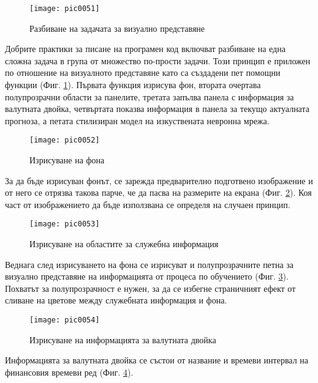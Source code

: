 \begin{figure}[h]
  \centering
  \texttt{[image: pic0051]}
  \caption{Разбиване на задачата за визуално представяне}
\label{fig:pic0051}
\end{figure}
\FloatBarrier

Добрите практики за писане на програмен код включват разбиване на една сложна задача в група от множество по-прости задачи. Този принцип е приложен по отношение на визуалното представяне като са създадени пет помощни функции (Фиг. \ref{fig:pic0051}).  Първата функция изрисува фон, втората очертава полупрозрачни области за панелите, третата запълва панела с информация за валутната двойка, четвъртата показва информация в панела за текущо актуалната прогноза, а петата стилизиран модел на изкуствената невронна мрежа. 

\begin{figure}[h]
  \centering
  \texttt{[image: pic0052]}
  \caption{Изрисуване на фона}
\label{fig:pic0052}
\end{figure}
\FloatBarrier

За да бъде изрисуван фонът, се зарежда предварително подготвено изображение и от него се отрязва такова парче, че да пасва на размерите на екрана (Фиг. \ref{fig:pic0052}). Коя част от изображението да бъде използвана се определя на случаен принцип.

\begin{figure}[h]
  \centering
  \texttt{[image: pic0053]}
  \caption{Изрисуване на областите за служебна информация}
\label{fig:pic0053}
\end{figure}
\FloatBarrier

Веднага след изрисуването на фона се изрисуват и полупрозрачните петна за визуално представяне на информацията от процеса по обучението (Фиг. \ref{fig:pic0053}). Похватът за полупрозрачност е нужен, за да се избегне страничният ефект от сливане на цветове между служебната информация и фона. 

\begin{figure}[h]
  \centering
  \texttt{[image: pic0054]}
  \caption{Изрисуване на информацията за валутната двойка}
\label{fig:pic0054}
\end{figure}
\FloatBarrier

Информацията за валутната двойка се състои от название и времеви интервал на финансовия времеви ред (Фиг. \ref{fig:pic0054}). 

